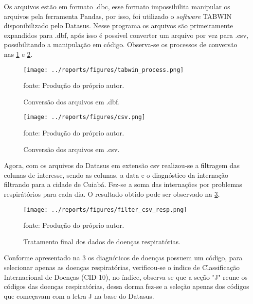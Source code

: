 \documentclass[
  12pt,		%
  a4paper,	%
  openright,%
  oneside,	%
  chapter=TITLE,		%
  section=TITLE,		%
  english,	%
  french,	%
  spanish,	%
  brazil	%
]{abntex2}
\begin{document}
    Os arquivos estão em formato .dbc, esse formato impossibilita manipular os arquivos pela ferramenta Pandas, por isso, 
    foi utilizado o \textit{software} TABWIN disponibilizado pelo Datasus. Nesse programa os arquivos são primeiramente
    expandidos para .dbf, após isso é possível converter um arquivo por vez para .csv, possibilitando a manipulação
    em código. Observa-se os processos de conversão nas \ref*{dbf_datasus} e \ref*{csv_datasus}.

    \begin{figure}[ht]
        \centering
        \caption{Conversão dos arquivos em .dbf.}
        \texttt{[image: ../reports/figures/tabwin\_process.png]}
        \label{dbf_datasus}
        \par
        {\small fonte: Produção do próprio autor.}
    \end{figure}

    \begin{figure}[ht]
        \centering
        \caption{Conversão dos arquivos em .csv.}
        \texttt{[image: ../reports/figures/csv.png]}
        \label{csv_datasus}
        \par
        {\small fonte: Produção do próprio autor.}
    \end{figure}

    Agora, com os arquivos do Datasus em extensão csv realizou-se a filtragem das colunas de interesse, sendo as colunas, a data e o
    diagnóstico da internação filtrando para a cidade de Cuiabá. Fez-se a soma das internações por problemas
    respirátórios para cada dia. O resultado obtido pode ser observado na \ref*{resp_dataset}.

    \begin{figure}[ht]
        \centering
        \caption{Tratamento final dos dados de doenças respiratórias.}
        \texttt{[image: ../reports/figures/filter\_csv\_resp.png]}
        \label{resp_dataset}
        \par
        {\small fonte: Produção do próprio autor.}
    \end{figure}

    Conforme apresentado na \ref*{resp_dataset} os diagnóticos de doenças possuem um código, para selecionar apenas as doenças
    respiratórias, verificou-se o índice de Classificação Internacional de Doenças (CID-10), no índice, observa-se que a 
    seção "J" reune os códigos das doenças respiratórias, dessa dorma fez-se a seleção apenas dos códigos que começavam com a letra J
    na base do Datasus.
\end{document}
